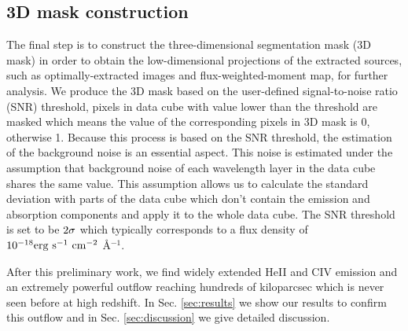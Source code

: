 \documentclass[../main.tex]{subfiles}
\begin{document}
 \subsection{3D mask construction}
 The final step is to construct the three-dimensional segmentation mask (3D mask) in order to obtain the low-dimensional projections of the extracted sources, such as optimally-extracted images and flux-weighted-moment map, for further analysis. We produce the 3D mask based on the user-defined signal-to-noise ratio (SNR) threshold, pixels in data cube with value lower than the threshold are masked which means the value of the corresponding pixels in 3D mask is 0, otherwise 1.  Because this process is based on the SNR threshold, the estimation of the background noise is an essential aspect. This noise is estimated under the assumption that background noise of each wavelength layer in the data cube shares the same value. This assumption allows us to calculate the standard deviation with parts of the data cube which don't contain the emission and absorption components and apply it to the whole data cube. The SNR threshold is set to be $\rm 2\sigma$ which typically corresponds to a flux density of $\rm 10^{-18} erg \ s^{-1} \ cm^{-2}$ \AA$^{-1}$.
 
 After this preliminary work, we find widely extended HeII and CIV emission and an extremely powerful outflow reaching hundreds of kiloparcsec which is never seen before at high redshift. In Sec. \ref{sec:results} we show our results to confirm this outflow and in Sec. \ref{sec:discussion} we give detailed discussion.
\end{document}
